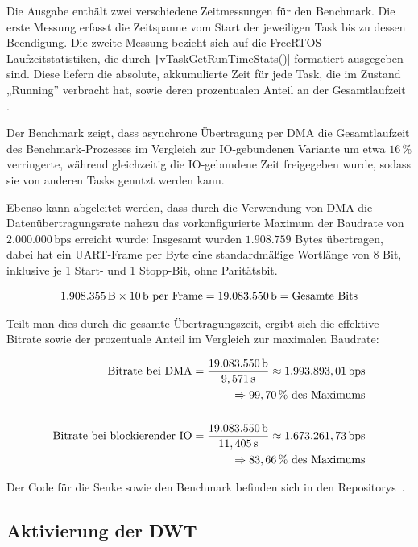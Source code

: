 Die Ausgabe enthält zwei verschiedene Zeitmessungen für den Benchmark. Die erste
Messung erfasst die Zeitspanne vom Start der jeweiligen Task bis zu dessen
Beendigung. Die zweite Messung bezieht sich auf die
FreeRTOS-Laufzeitstatistiken, die durch \texttt|vTaskGetRunTimeStats()|
formatiert ausgegeben sind. Diese liefern die absolute, akkumulierte Zeit für
jede Task, die im Zustand „Running” verbracht hat, sowie deren prozentualen
Anteil an der Gesamtlaufzeit \cite{freertos_runtime_stats}.

Der Benchmark zeigt, dass asynchrone Übertragung per DMA die Gesamtlaufzeit des
Benchmark-Prozesses im Vergleich zur IO-gebundenen Variante um etwa $16\,\%$
verringerte, während gleichzeitig die IO-gebundene Zeit freigegeben wurde,
sodass sie von anderen Tasks genutzt werden kann.

Ebenso kann abgeleitet werden, dass durch die Verwendung von DMA die
Datenübertragungsrate nahezu das vorkonfigurierte Maximum der Baudrate von
$2.000.000\,\text{bps}$ erreicht wurde: Insgesamt wurden $1.908.759$ Bytes
übertragen, dabei hat ein UART-Frame per Byte eine standardmäßige Wortlänge von
8 Bit, inklusive je 1 Start- und 1 Stopp-Bit, ohne Paritätsbit.

\begin{align*}
    1.908.355\text{\,B} \times 10\text{\,b per Frame} =
    19.083.550 \text{\,b} = \text{Gesamte Bits}
\end{align*}

Teilt man dies durch die gesamte Übertragungszeit, ergibt sich die effektive
Bitrate sowie der prozentuale Anteil im Vergleich zur maximalen Baudrate:

\begin{align*}
    \text{Bitrate bei DMA} =
    \frac{19.083.550\text{\,b}}{9,571\text{\,s}} \approx
    1.993.893,01 \text{\,bps} \\
    \quad \Rightarrow 99,70\,\%\text{ des Maximums} \\
    \\
    \text{Bitrate bei blockierender IO} =
    \frac{19.083.550\text{\,b}}{11,405\text{\,s}} \approx
    1.673.261,73 \text{\,bps} \\
    \quad \Rightarrow 83,66\,\% \text{ des Maximums}
\end{align*}

Der Code für die Senke sowie den Benchmark befinden sich in den
Repositorys~\cite{freertos_threadsafe_sink, freertos_tsink_benchmark}.

\subsection{Aktivierung der DWT}

